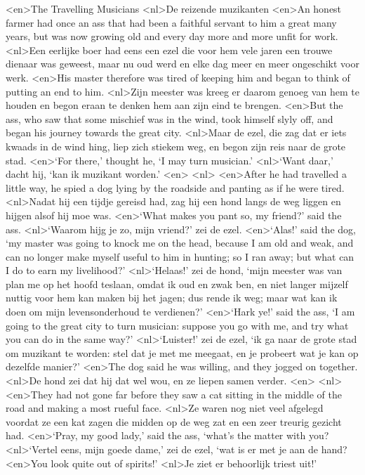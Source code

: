 <en>The Travelling Musicians
<nl>De reizende muzikanten
<en>An honest farmer had once an ass that had been a faithful servant to him a great many years, but was now growing old and every day more and more unfit for work.
<nl>Een eerlijke boer had eens een ezel die voor hem vele jaren een trouwe dienaar was geweest, maar nu  oud werd en elke dag meer en meer ongeschikt voor werk.
<en>His master therefore was tired of keeping him and began to think of putting an end to him.
<nl>Zijn meester was kreeg er daarom genoeg van hem te houden en begon eraan te denken  hem aan zijn eind te brengen.
<en>But the ass, who saw that some mischief was in the wind, took himself slyly off, and began his journey towards the great city.
<nl>Maar de ezel, die zag dat er iets kwaads in de wind hing, liep zich stiekem  weg, en begon zijn reis naar de grote stad.
<en>‘For there,' thought he, `I may turn musician.'
<nl>`Want daar,' dacht hij, `kan ik muzikant worden.'
<en>
<nl>
<en>After he had travelled a little way, he spied a dog lying by the roadside and panting as if he were tired.
<nl>Nadat hij een tijdje gereisd had, zag hij een hond langs de weg liggen en hijgen alsof hij moe was.
<en>`What makes you pant so, my friend?' said the ass.
<nl>`Waarom hijg je zo, mijn vriend?' zei de ezel.
<en>`Alas!' said the dog, `my master was going to knock me on the head, because I am old and weak, and can no longer make myself useful to him in hunting; so I ran away; but what can I do to earn my livelihood?'
<nl>`Helaas!' zei de hond, `mijn meester was van plan me op het hoofd teslaan, omdat ik oud en zwak ben, en niet langer mijzelf nuttig voor hem kan maken  bij het jagen; dus rende ik weg; maar wat kan ik doen om mijn levensonderhoud te verdienen?'
<en>`Hark ye!' said the ass, `I am going to the great city to turn musician: suppose you go with me, and try what you can do in the same way?'
<nl>`Luister!' zei de ezel, `ik ga naar de grote stad om muzikant te worden: stel dat je met me meegaat, en je probeert wat je kan op dezelfde manier?'
<en>The dog said he was willing, and they jogged on together.
<nl>De hond zei dat hij dat wel wou, en ze liepen samen verder.
<en>
<nl>
<en>They had not gone far before they saw a cat sitting in the middle of the road and making a most rueful face.
<nl>Ze waren nog niet veel afgelegd voordat ze een kat zagen die midden op de weg zat en een zeer treurig gezicht had.
<en>`Pray, my good lady,' said the ass, `what's the matter with you?
<nl>`Vertel eens, mijn goede dame,' zei de ezel, `wat is er met je aan de hand?
<en>You look quite out of spirits!'
<nl>Je ziet er behoorlijk triest uit!'
